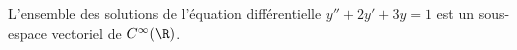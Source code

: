 L'ensemble des solutions de l'équation différentielle $y'' + 2y' + 3y = 1$ est un sous-espace vectoriel de $C^\infty(\R)$.

\begin{reponses}
\end{reponses}

